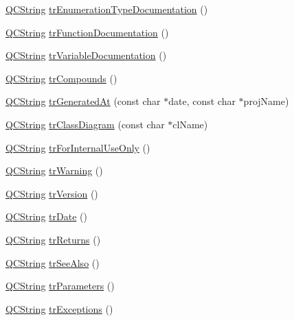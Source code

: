 \begin{DoxyCompactItemize}
\item 
\hyperlink{class_q_c_string}{Q\-C\-String} \hyperlink{class_translator_italian_ae11f24a699bb6c1becaf521cdac12ab0}{tr\-Enumeration\-Type\-Documentation} ()
\item 
\hyperlink{class_q_c_string}{Q\-C\-String} \hyperlink{class_translator_italian_a54c0fb7e39b052558da3844673b26e1e}{tr\-Function\-Documentation} ()
\item 
\hyperlink{class_q_c_string}{Q\-C\-String} \hyperlink{class_translator_italian_aeff3c7fbc21cb023b224c101b81210ed}{tr\-Variable\-Documentation} ()
\item 
\hyperlink{class_q_c_string}{Q\-C\-String} \hyperlink{class_translator_italian_ae2c887f8a9fe5663d722b798b02628e8}{tr\-Compounds} ()
\item 
\hyperlink{class_q_c_string}{Q\-C\-String} \hyperlink{class_translator_italian_a6675fccca4756f9c0d86797009a4ad7e}{tr\-Generated\-At} (const char $\ast$date, const char $\ast$proj\-Name)
\item 
\hyperlink{class_q_c_string}{Q\-C\-String} \hyperlink{class_translator_italian_a5dc8187057a8e4f4ca85ad94ade9e82c}{tr\-Class\-Diagram} (const char $\ast$cl\-Name)
\item 
\hyperlink{class_q_c_string}{Q\-C\-String} \hyperlink{class_translator_italian_ac4cc9aa408e288c1e2b037ec3b23c4f7}{tr\-For\-Internal\-Use\-Only} ()
\item 
\hyperlink{class_q_c_string}{Q\-C\-String} \hyperlink{class_translator_italian_aae1caf252b911312ae9c13e4f478cea3}{tr\-Warning} ()
\item 
\hyperlink{class_q_c_string}{Q\-C\-String} \hyperlink{class_translator_italian_ae87e51832e87155cee39f9446452eea5}{tr\-Version} ()
\item 
\hyperlink{class_q_c_string}{Q\-C\-String} \hyperlink{class_translator_italian_a8a42054aac49264702e63d0048612a63}{tr\-Date} ()
\item 
\hyperlink{class_q_c_string}{Q\-C\-String} \hyperlink{class_translator_italian_a866a7410912e8a146c122548bcc313d5}{tr\-Returns} ()
\item 
\hyperlink{class_q_c_string}{Q\-C\-String} \hyperlink{class_translator_italian_ae2a38af2f296dd4c81df824a17ac5024}{tr\-See\-Also} ()
\item 
\hyperlink{class_q_c_string}{Q\-C\-String} \hyperlink{class_translator_italian_aed4586c549471023ca731d18612fe1d6}{tr\-Parameters} ()
\item 
\hyperlink{class_q_c_string}{Q\-C\-String} \hyperlink{class_translator_italian_afd184af42e35d6ef611899532f80935c}{tr\-Exceptions} ()

\end{DoxyCompactItemize}
